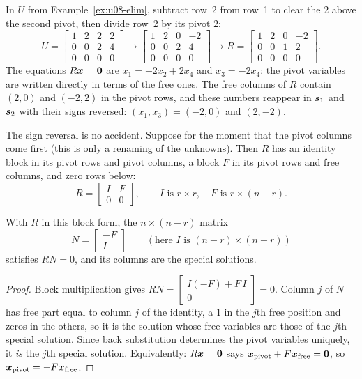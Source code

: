 \begin{example}\label{ex:u08-rref}
In $U$ from Example~\ref{ex:u08-elim}, subtract row~2 from row~1 to clear the $2$ above the
second pivot, then divide row~2 by its pivot $2$:
\[
U=\begin{bmatrix}1&2&2&2\\0&0&2&4\\0&0&0&0\end{bmatrix}\longrightarrow
\begin{bmatrix}1&2&0&-2\\0&0&2&4\\0&0&0&0\end{bmatrix}\longrightarrow
R=\begin{bmatrix}1&2&0&-2\\0&0&1&2\\0&0&0&0\end{bmatrix}.
\]
The equations $R\boldsymbol{x}=\boldsymbol{0}$ are $x_1=-2x_2+2x_4$ and $x_3=-2x_4$: the pivot variables are
written directly in terms of the free ones. The free columns of $R$ contain $(2,0)$ and
$(-2,2)$ in the pivot rows, and these numbers reappear in $\boldsymbol{s}_1$ and $\boldsymbol{s}_2$ with their
signs reversed: $(x_1,x_3)=(-2,0)$ and $(2,-2)$.
\end{example}

The sign reversal is no accident. Suppose for the moment that the pivot columns come first (this
is only a renaming of the unknowns). Then $R$ has an identity block in its pivot rows and pivot
columns, a block $F$ in its pivot rows and free columns, and zero rows below:
\[
R=\begin{bmatrix}I&F\\0&0\end{bmatrix},\qquad I\text{ is }r\times r,\quad F\text{ is }r\times(n-r).
\]

\begin{proposition}\label{prop:u08-nullmatrix}
With $R$ in this block form, the $n\times(n-r)$ matrix
\[
N=\begin{bmatrix}-F\\ I\end{bmatrix}\qquad(\text{here }I\text{ is }(n-r)\times(n-r))
\]
satisfies $RN=0$, and its columns are the special solutions.
\end{proposition}
\begin{proof}
Block multiplication gives $RN=\begin{bmatrix}I(-F)+F\,I\\ 0\end{bmatrix}=0$. Column $j$ of $N$
has free part equal to column $j$ of the identity, a $1$ in the $j$th free position and zeros
in the others, so it is the solution whose free variables are those of the $j$th special
solution. Since back substitution determines the pivot variables uniquely, it \emph{is} the
$j$th special solution. Equivalently: $R\boldsymbol{x}=\boldsymbol{0}$ says
$\boldsymbol{x}_{\text{pivot}}+F\boldsymbol{x}_{\text{free}}=\boldsymbol{0}$, so $\boldsymbol{x}_{\text{pivot}}=-F\boldsymbol{x}_{\text{free}}$.
\end{proof}

